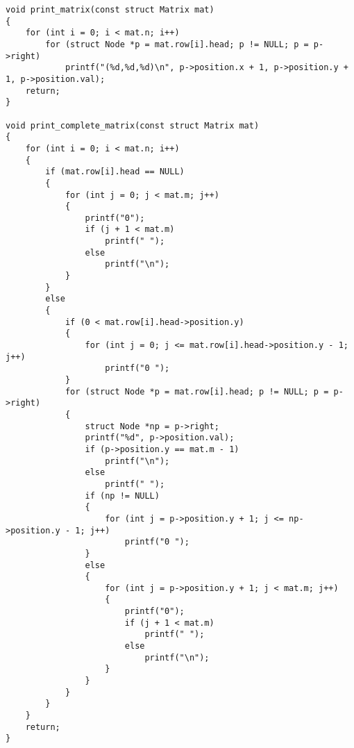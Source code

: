 \documentclass[12pt]{article}
\begin{document}
{\begin{lstlisting}
void print_matrix(const struct Matrix mat)
{
    for (int i = 0; i < mat.n; i++)
        for (struct Node *p = mat.row[i].head; p != NULL; p = p->right)
            printf("(%d,%d,%d)\n", p->position.x + 1, p->position.y + 1, p->position.val);
    return;
}

void print_complete_matrix(const struct Matrix mat)
{
    for (int i = 0; i < mat.n; i++)
    {
        if (mat.row[i].head == NULL)
        {
            for (int j = 0; j < mat.m; j++)
            {
                printf("0");
                if (j + 1 < mat.m)
                    printf(" ");
                else
                    printf("\n");
            }
        }
        else
        {
            if (0 < mat.row[i].head->position.y)
            {
                for (int j = 0; j <= mat.row[i].head->position.y - 1; j++)
                    printf("0 ");
            }
            for (struct Node *p = mat.row[i].head; p != NULL; p = p->right)
            {
                struct Node *np = p->right;
                printf("%d", p->position.val);
                if (p->position.y == mat.m - 1)
                    printf("\n");
                else
                    printf(" ");
                if (np != NULL)
                {
                    for (int j = p->position.y + 1; j <= np->position.y - 1; j++)
                        printf("0 ");
                }
                else
                {
                    for (int j = p->position.y + 1; j < mat.m; j++)
                    {
                        printf("0");
                        if (j + 1 < mat.m)
                            printf(" ");
                        else
                            printf("\n");
                    }
                }
            }
        }
    }
    return;
}


\end{lstlisting}}
\end{document}
